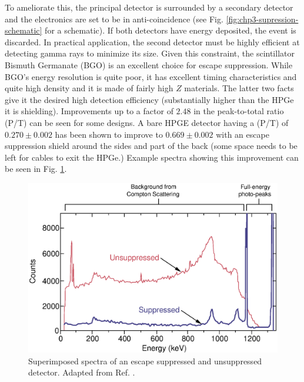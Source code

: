 To ameliorate this, the principal detector is surrounded by a secondary detector and the electronics are set to be in anti-coincidence (see Fig. \ref{fig:chp3-supression-schematic} for a schematic). If both detectors have energy deposited, the event is discarded. In practical application, the second detector must be highly efficient at detecting gamma rays to minimize its size. Given this constraint, the scintillator Bismuth Germanate (BGO) is an excellent choice for escape suppression. While BGO's energy resolution is quite poor, it has excellent timing characteristics and quite high density and it is made of fairly high $Z$ materials. The latter two facts give it the desired high detection efficiency (substantially higher than the HPGe it is shielding). Improvements up to a factor of $2.48$ in the peak-to-total ratio (P/T) can be seen for some designs. A bare HPGE detector having a (P/T) of $0.270\pm0.002$ has been shown to improve to $0.669\pm0.002$\cite{GSComptonSuppression} with an escape suppression shield around the sides and part of the back (some space needs to be left for cables to exit the HPGe.) Example spectra showing this improvement can be seen in Fig. \ref{fig:chp3-supression-improvement}.

\begin{figure}[h!]
	\centerline{\includegraphics[height=0.25\textheight]{./img/c3/suppressed_spectra.eps}}
	\caption{Superimposed spectra of an escape suppressed and unsuppressed detector. Adapted from Ref. \cite{gsBooklet}.\label{fig:chp3-supression-improvement}}
\end{figure}

